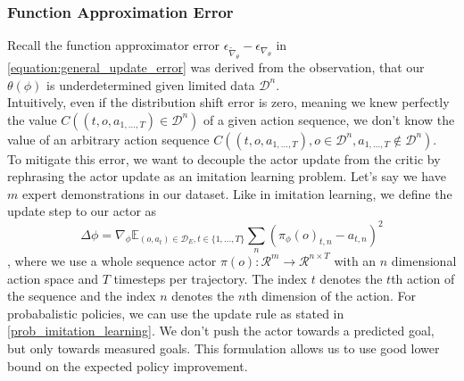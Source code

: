 \subsubsection{Function Approximation Error}
\label{func_app_error}
Recall the function approximator error $\epsilon_{\widetilde{\nabla}_{\theta}} - \epsilon_{\nabla_{\theta}}$ in \ref{equation:general_update_error} was 
derived from the observation, that our $\theta(\phi)$ is underdetermined 
given limited data $\mathcal{D}^n$. \\
Intuitively, even if the distribution shift error is zero, meaning we knew perfectly the value 
$C((t, o, a_{1,...,T}) \in \mathcal{D}^n)$ of a given action sequence, we don't know the value of an arbitrary action sequence
$C((t, o, a_{1,...,T}), o \in \mathcal{D}^n, a_{1,...,T} \notin \mathcal{D}^n)$.\\
To mitigate this error, we want to decouple the actor update from the critic by rephrasing the actor update as an imitation learning problem. 
Let's say we have $m$ expert demonstrations in our dataset. 
Like in imitation learning, we define the update step to our actor as
\begin{equation}
    \Delta \phi = \nabla_{\phi} \mathbb{E}_{(o, a_{t}) \in \mathcal{D}_E, t \in \{1, ..., T\}}\sum_n \left(\pi_{\phi}(o)_{t, n} - a_{t, n}\right)^2
\end{equation}
, where we use a whole sequence actor 
$\pi(o):\mathcal{R}^m \rightarrow \mathcal{R}^{n \times T}$ with an $n$ dimensional action space and $T$ timesteps per trajectory. The index $t$ denotes the $t$th action of the sequence and the index $n$ denotes the $n$th dimension of 
the action. For probabalistic policies, we can use the update rule as stated in \ref{prob_imitation_learning}. We don't push the actor towards a predicted goal, 
but only towards measured goals. This formulation allows us to use good lower bound on the expected policy improvement.\\

